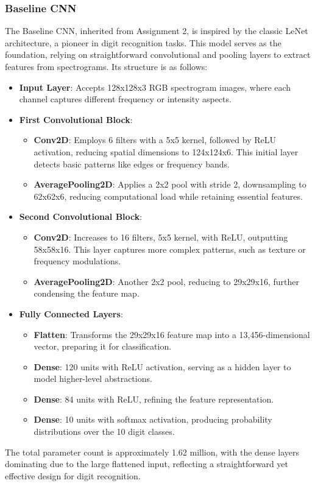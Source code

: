 \documentclass[12pt]{article}
\begin{document}
\subsubsection{Baseline CNN}
The Baseline CNN, inherited from Assignment 2, is inspired by the classic LeNet architecture, a pioneer in digit recognition tasks. This model serves as the foundation, relying on straightforward convolutional and pooling layers to extract features from spectrograms. Its structure is as follows:
\begin{itemize}
    \item \textbf{Input Layer}: Accepts 128x128x3 RGB spectrogram images, where each channel captures different frequency or intensity aspects.
    \item \textbf{First Convolutional Block}:
        \begin{itemize}
            \item \textbf{Conv2D}: Employs 6 filters with a 5x5 kernel, followed by ReLU activation, reducing spatial dimensions to 124x124x6. This initial layer detects basic patterns like edges or frequency bands.
            \item \textbf{AveragePooling2D}: Applies a 2x2 pool with stride 2, downsampling to 62x62x6, reducing computational load while retaining essential features.
        \end{itemize}
    \item \textbf{Second Convolutional Block}:
        \begin{itemize}
            \item \textbf{Conv2D}: Increases to 16 filters, 5x5 kernel, with ReLU, outputting 58x58x16. This layer captures more complex patterns, such as texture or frequency modulations.
            \item \textbf{AveragePooling2D}: Another 2x2 pool, reducing to 29x29x16, further condensing the feature map.
        \end{itemize}
    \item \textbf{Fully Connected Layers}:
        \begin{itemize}
            \item \textbf{Flatten}: Transforms the 29x29x16 feature map into a 13,456-dimensional vector, preparing it for classification.
            \item \textbf{Dense}: 120 units with ReLU activation, serving as a hidden layer to model higher-level abstractions.
            \item \textbf{Dense}: 84 units with ReLU, refining the feature representation.
            \item \textbf{Dense}: 10 units with softmax activation, producing probability distributions over the 10 digit classes.
        \end{itemize}
\end{itemize}
The total parameter count is approximately 1.62 million, with the dense layers dominating due to the large flattened input, reflecting a straightforward yet effective design for digit recognition.
\end{document}
